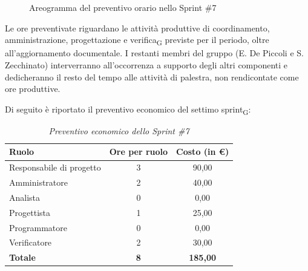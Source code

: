\documentclass[a4paper, 10pt, colorlinks=true, linkcolor=black, urlcolor=blue, citecolor=blue, hidelinks]{article}
\renewcommand{\arraystretch}{1.2}
\begin{document}
\begin{figure}[H]

\caption{Areogramma del preventivo orario nello Sprint \#7}
\label{fig:preventivo-sprint7}
\end{figure}

Le ore preventivate riguardano le attività produttive di coordinamento, amministrazione, progettazione e verifica\textsubscript{G} previste per il periodo, oltre all'aggiornamento documentale. I restanti membri del gruppo (E. De Piccoli e S. Zecchinato) interverranno all'occorrenza a supporto degli altri componenti e dedicheranno il resto del tempo alle attività di palestra, non rendicontate come ore produttive.

Di seguito è riportato il preventivo economico del settimo sprint\textsubscript{G}:

\begin{table}[H]
    \centering
    \renewcommand{\arraystretch}{1.4}
    \begin{tabular}{|l|c|c|}
        \hline
        \rowcolor{bluBitless!15}
        \textbf{Ruolo} & \textbf{Ore per ruolo} & \textbf{Costo (in €)} \\
        \hline
        Responsabile di progetto & 3 & 90,00 \\ \hline
        Amministratore & 2 & 40,00 \\ \hline
        Analista & 0 & 0,00 \\ \hline
        Progettista & 1 & 25,00 \\ \hline
        Programmatore & 0 & 0,00 \\ \hline
        Verificatore & 2 & 30,00 \\ \hline
        \rowcolor{bluBitless!8}
        \textbf{Totale} & \textbf{8} & \textbf{185,00} \\ \hline
    \end{tabular}
    \caption{\textit{Preventivo economico dello Sprint \#7}}
\end{table}
\end{document}
